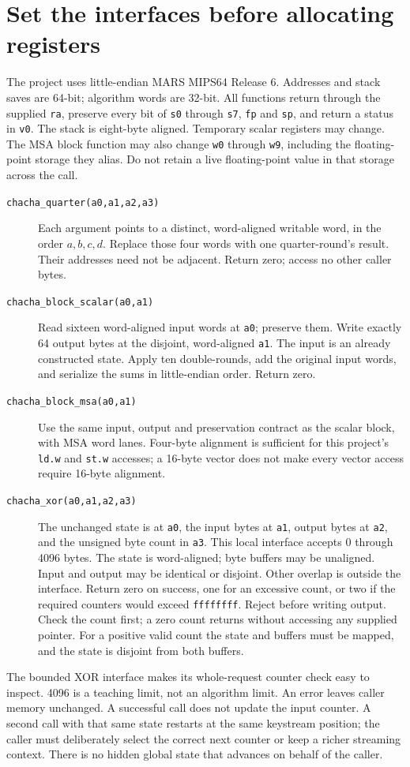 \section{Set the interfaces before allocating registers}
The project uses little-endian MARS MIPS64 Release 6. Addresses and stack saves are
64-bit; algorithm words are 32-bit. All functions return through the supplied
\texttt{ra}, preserve every bit of \texttt{s0} through \texttt{s7}, \texttt{fp} and
\texttt{sp}, and return a status in \texttt{v0}. The stack is eight-byte aligned.
Temporary scalar registers may change. The MSA block function may also change
\texttt{w0} through \texttt{w9}, including the floating-point storage they alias.
Do not retain a live floating-point value in that storage across the call.

\begin{description}
\item[\texttt{chacha\_quarter(a0,a1,a2,a3)}]
Each argument points to a distinct, word-aligned writable word, in the order
\(a,b,c,d\). Replace those four words with one quarter-round's result. Their addresses
need not be adjacent. Return zero; access no other caller bytes.
\item[\texttt{chacha\_block\_scalar(a0,a1)}]
Read sixteen word-aligned input words at \texttt{a0}; preserve them. Write exactly
64 output bytes at the disjoint, word-aligned \texttt{a1}. The input is an already
constructed state. Apply ten double-rounds, add the original input words, and serialize
the sums in little-endian order. Return zero.
\item[\texttt{chacha\_block\_msa(a0,a1)}]
Use the same input, output and preservation contract as the scalar block, with MSA
word lanes. Four-byte alignment is sufficient for this project's \texttt{ld.w} and
\texttt{st.w} accesses; a 16-byte vector does not make every vector access require
16-byte alignment.
\item[\texttt{chacha\_xor(a0,a1,a2,a3)}]
The unchanged state is at \texttt{a0}, the input bytes at \texttt{a1}, output bytes at
\texttt{a2}, and the unsigned byte count in \texttt{a3}. This local interface accepts
0 through 4096 bytes. The state is word-aligned; byte buffers may be unaligned. Input
and output may be identical or disjoint. Other overlap is outside the interface.
Return zero on success, one for an excessive count, or two if the required counters
would exceed \texttt{ffffffff}. Reject before writing output. Check the count first;
a zero count returns without accessing any supplied pointer. For a positive valid
count the state and buffers must be mapped, and the state is disjoint from both buffers.
\end{description}

The bounded XOR interface makes its whole-request counter check easy to inspect.
4096 is a teaching limit, not an algorithm limit. An error leaves caller memory
unchanged. A successful call does not update the input counter. A second call with
that same state restarts at the same keystream position; the caller must deliberately
select the correct next counter or keep a richer streaming context. There is no
hidden global state that advances on behalf of the caller.
